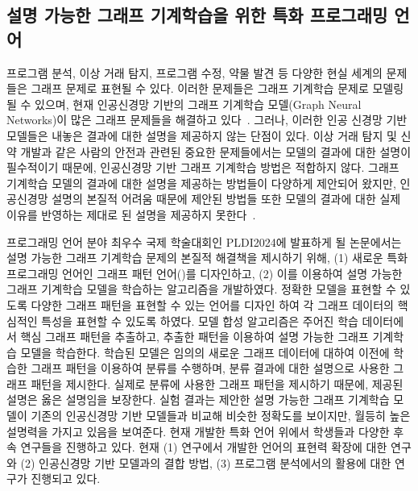 \documentclass[11pt]{article}
\begin{document}
\begin{spacing}{1.145}
\section{설명 가능한 그래프 기계학습을 위한 특화 프로그래밍 언어}
%
프로그램 분석, 이상 거래 탐지, 프로그램 수정, 약물 발견 등 다양한 현실 세계의 문제들은 그래프 문제로 표현될 수 있다.
%
이러한 문제들은 그래프 기계학습 문제로 모델링될 수 있으며, 현재 인공신경망 기반의 그래프 기계학습 모델(Graph Neural Networks)이 많은 그래프 문제들을 해결하고 있다~\cite{wu2019comprehensive}.
%
그러나, 이러한 인공 신경망 기반 모델들은 내놓은 결과에 대한 설명을 제공하지 않는 단점이 있다.
%
이상 거래 탐지 및 신약 개발과 같은 사람의 안전과 관련된 중요한 문제들에서는 모델의 결과에 대한 설명이 필수적이기 때문에, 인공신경망 기반 그래프 기계학습 방법은 적합하지 않다.
%
그래프 기계학습 모델의 결과에 대한 설명을 제공하는 방법들이 다양하게 제안되어 왔지만, 인공신경망 설명의 본질적 어려움 때문에 제안된 방법들 또한 모델의 결과에 대한 실제 이유를 반영하는 제대로 된 설명을 제공하지 못한다~\cite{yuan20survey}.

프로그래밍 언어 분야 최우수 국제 학술대회인 PLDI2024에 발표하게 될 논문에서는 설명 가능한 그래프 기계학습 문제의 본질적 해결책을 제시하기 위해, (1) 새로운 특화 프로그래밍 언어인 그래프 패턴 언어(\GDL)를 디자인하고, (2) 이를 이용하여 설명 가능한 그래프 기계학습 모델을 학습하는 알고리즘을 개발하였다.
%
정확한 모델을 표현할 수 있도록 다양한 그래프 패턴을 표현할 수 있는 언어를 디자인 하여 각 그래프 데이터의 핵심적인 특성을 표현할 수 있도록 하였다.
%
모델 합성 알고리즘은 주어진 학습 데이터에서 핵심 그래프 패턴을 추출하고, 추출한 패턴을 이용하여 설명 가능한 그래프 기계학습 모델을 학습한다.
%
학습된 모델은 임의의 새로운 그래프 데이터에 대하여 이전에 학습한 그래프 패턴을 이용하여 분류를 수행하며, 분류 결과에 대한 설명으로 사용한 그래프 패턴을 제시한다.
%
실제로 분류에 사용한 그래프 패턴을 제시하기 때문에, 제공된 설명은 옳은 설명임을 보장한다.
%
실험 결과는 제안한 설명 가능한 그래프 기계학습 모델이 기존의 인공신경망 기반 모델들과 비교해 비슷한 정확도를 보이지만, 월등히 높은 설명력을 가지고 있음을 보여준다.
%
현재 개발한 특화 언어 위에서 학생들과 다양한 후속 연구들을 진행하고 있다.
%
현재 (1) 연구에서 개발한 언어의 표현력 확장에 대한 연구와 (2) 인공신경망 기반 모델과의 결합 방법, (3) 프로그램 분석에서의 활용에 대한 연구가 진행되고 있다.






\end{spacing}
\end{document}
